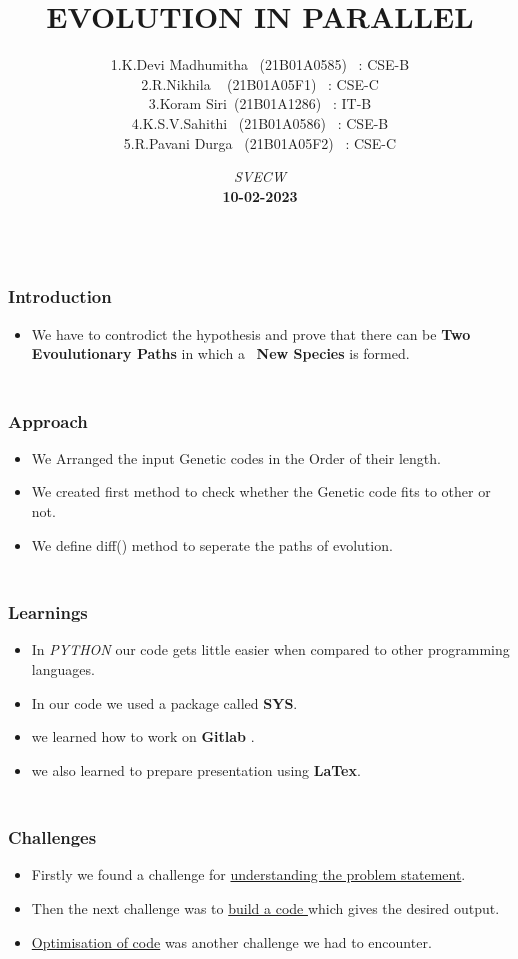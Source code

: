 \documentclass{beamer}
\title{ EVOLUTION IN PARALLEL}
\date{\textit{SVECW}\\ \textbf{10-02-2023}}
\author[Batch-12]{\raggedright1.K.Devi Madhumitha \ (21B01A0585) \ : CSE-B\\2.R.Nikhila \ \hspace{1.9cm} (21B01A05F1) \ : CSE-C \\3.Koram Siri\ \hspace{1.9cm}(21B01A1286) \ : IT-B \\4.K.S.V.Sahithi \ \hspace{1.3cm}(21B01A0586) \ : CSE-B\\5.R.Pavani Durga \ \hspace{0.9cm}(21B01A05F2) \ : CSE-C
}
\begin{document}
    \begin{frame}
        \titlepage
    \end{frame}
    \begin{frame}
 \frametitle{\\ \hspace{0.3cm} \Huge Introduction}
        \begin{itemize}
     \item We have to controdict the hypothesis and prove that there can be\textbf{ Two Evoulutionary Paths }in which a \
     \textbf{New Species} is formed.
 \end{itemize}
    \end{frame}
    \begin{frame}
 \frametitle{\\ \hspace{0.3cm}\Huge Approach}
 \begin{itemize}
     \item We Arranged the input Genetic codes in the Order of their length.\\ \item We created  first method to check whether the Genetic code fits to other or not.\\ \item We define diff() method to seperate
the paths of evolution.
 \end{itemize}
    \end{frame}
    \begin{frame}
        \frametitle{\\ \hspace{0.3cm}\Huge Learnings}
 \begin{itemize}
     \item In \textit{PYTHON} our code gets little easier when compared to other programming languages.
    \\ \item In our code we used a package called \textbf{SYS}.
    \\ \item we learned how to work on \textbf{Gitlab }.
    \\ \item we also learned to prepare presentation using \textbf{LaTex}.

 \end{itemize}
    \end{frame}
    \begin{frame}
 \frametitle{\\ \hspace{0.3cm} \Huge Challenges}
        \begin{itemize}
     \item Firstly we found a challenge for \underline {understanding the problem statement}.\\
     \item Then the next challenge was to \underline{build a code }which gives the desired output.\\
     \item \underline{Optimisation of code} was another challenge we had to encounter.
        \end{itemize}
    \end{frame}
   
\end{document}
